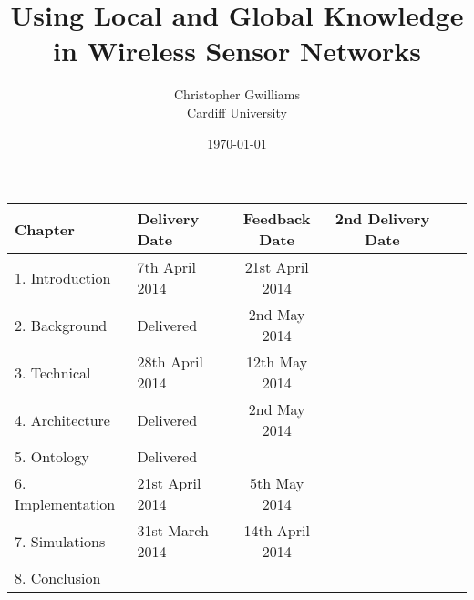 \documentclass[12pt, a4paper]{report}
\begin{document}
\title{Using Local and Global Knowledge in Wireless Sensor Networks}
\author{Christopher Gwilliams\\Cardiff University}
\date{\today}
\maketitle 

		\begin{table*}
			\hfill{}
			\begin{tabular}{|l|l|c|c|c|c|}
				\hline
					Chapter & Delivery Date & Feedback Date & 2nd Delivery Date \\
				\hline
					1. Introduction & 7th April 2014 & 21st April 2014 & \\
					2. Background & Delivered & 2nd May 2014 & \\
					3. Technical & 28th April 2014 & 12th May 2014 & \\
					4. Architecture & Delivered & 2nd May 2014 & \\
					5. Ontology & Delivered & & \\
					6. Implementation & 21st April 2014 & 5th May 2014 & \\
					7. Simulations & 31st March 2014 & 14th April 2014 & \\
					8. Conclusion & & & \\			
				\hline
			\end{tabular}
			\hfill{}
		\end{table*}		

\tableofcontents
\listoffigures
\listoftables
\end{document}
